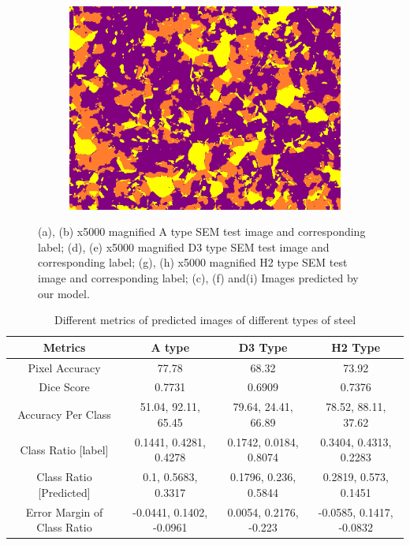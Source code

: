 \documentclass[]{article}
\begin{document}
\begin{figure}[!h]
\begin{subfigure}[b]{0.3\textwidth}
		\includegraphics[width=\textwidth]{images/inference/D3-type-P.png}
		\caption{}
		\label{fig:D3-type-pred}
	\end{subfigure}
	
	\caption{(a), (b) x5000 magnified A type SEM test image and corresponding label; (d), (e) x5000 magnified D3 type SEM test image and corresponding label; (g), (h) x5000 magnified H2 type SEM test image and corresponding label; (c), (f) and(i) Images predicted by our model.}
	\label{fig:diffsteeldiffmag}
\end{figure}


\begin{table}[h!]
	\centering
	\begin{tabular}{|c|c|c|c|}
		\hline
		\textbf{Metrics} & \textbf{A type} & \textbf{D3 Type} & \textbf{H2 Type}\\
		\hline
		Pixel Accuracy & 77.78 & 68.32 & 73.92 \\
		\hline
		Dice Score & 0.7731 & 0.6909 & 0.7376 \\
		\hline
		Accuracy Per Class & 51.04, 92.11, 65.45 & 79.64, 24.41, 66.89 & 78.52, 88.11, 37.62 \\
		\hline
		Class Ratio [label] & 0.1441, 0.4281, 0.4278 & 0.1742, 0.0184, 0.8074 & 0.3404, 0.4313, 0.2283 \\
		\hline
		Class Ratio [Predicted] & 0.1, 0.5683, 0.3317 & 0.1796, 0.236, 0.5844 & 0.2819, 0.573, 0.1451 \\
		\hline
		Error Margin of Class Ratio & -0.0441, 0.1402, -0.0961 & 0.0054, 0.2176, -0.223 & -0.0585, 0.1417, -0.0832 \\
		\hline
	\end{tabular}
	\caption{Different metrics of predicted images of different types of steel}
\end{table}
\end{document}
